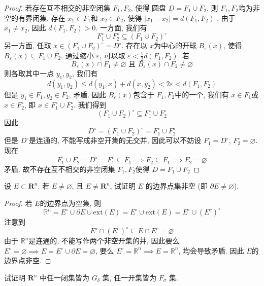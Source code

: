 \documentclass[../main.tex]{subfiles}
\begin{document}
\begin{proof}
    若存在互不相交的非空闭集 \(  F_1, F_2  \), 使得 圆盘 \(  D= F_1\cup F_2  \). 则 \(  F_1,F_2  \)均为非空的有界闭集.   存在 \(  x_1\in F_1  \)和 \(  x_2\in F_2  \), 使得 \(  \left| x_1-x_2 \right|= d\left( F_1,F_2 \right)    \)   . 由于 \(  x_1\neq x_2  \), 因此 \(  d\left( F_1,F_2 \right)> 0   \). 一方面, 我们有 \[
    F_1^{\circ}\cup F_2^{\circ}\subseteq \left( F_1\cup F_2 \right)^{\circ} 
    \]  另一方面, 任取 \(  x\in \left( F_1\cup F_2 \right)^{\circ}= D^{\circ}   \). 存在以  \(  x  \)为中心的开球 \(  B_{ \varepsilon }\left( x \right)   \), 使得 \(  B_{ \varepsilon }\left( x \right)\subseteq F_1\cup F_2   \). 通过缩小 \(   \varepsilon   \), 可以取 \(   \varepsilon < \frac{1 }{2 }d\left( F_1,F_2 \right)    \). 若 \[
    B_{ \varepsilon }\left( x \right)\cap F_1\neq \varnothing\text{ 且 } B_{ \varepsilon }\left( x \right)\cap F_2\neq \varnothing  
    \]  则各取其中一点 \(  y_1,y_2  \), 我们有 \[
    d\left( y_1,y_2 \right)\le d\left( y_1,x \right)+ d\left( x,y_2 \right)< 2 \varepsilon < d\left( F_1,F_2 \right)    
    \] 但是 \(  y_1\in F_1, y_2\in F_2  \), 矛盾. 因此 \(  B_{ \varepsilon }\left( x \right)   \)包含于 \(  F_1,F_2  \)中的一个, 我们有 \(  x \in F_1^{\circ}  \)或 \(  x\in F_2^{\circ}  \), 即 \(  x \in F_1^{\circ}\cup F_2^{\circ}  \).   我们得到 \[
    \left( F_1\cup F_2 \right)^{\circ}\subseteq F_1^{\circ}\cup F_2^{\circ} 
    \]  因此 \[
    D^{\circ}= \left( F_1\cup F_2 \right)^{\circ}= F_1^{\circ}\cup F_2^{\circ} 
    \]但是 \(  D^{\circ}  \)是连通的, 不能写成非空开集的无交并, 因此可以不妨设 \(  F_1^{\circ}= D^{\circ}  \), \(  F_2^{\circ}= \varnothing  \). 现在 \[
    F_1\cup F_2= \overline{D^{\circ}}= \overline{F_1^{\circ}}\subseteq  F_1\implies F_2\subseteq F_1\implies F_2= \varnothing
    \]   矛盾. 故不存在互不相交的非空闭集 \(  F_1,F_2  \)使得 \(  D= F_1\cup F_2  \)  
\end{proof}

\begin{exercise}{}{}
设 $E \subset \mathbf{R}^n$. 若 $E \neq \varnothing$, 且 $E \neq \mathbf{R}^n$, 试证明 $E$ 的边界点集非空 (即 $\partial E \neq \varnothing$).
\end{exercise}
\begin{proof}
    若 \(  E  \)的边界点为空集, 则 \[
    \mathbb{R} ^{n}= E^{\circ}\cup  \partial E\cup  \mathrm{ext}\left( E \right)= E^{\circ}\cup \mathrm{ext}\left( E \right)= E^{\circ}\cup \left( E^{c} \right)^{\circ}   
    \] 注意到\[
    E^{\circ}\cap \left( E^{c} \right)^{\circ}\subseteq E\cap E^{c}= \varnothing 
    \]由于 \(  \mathbb{R} ^{n}  \)是连通的, 不能写作两个非空开集的并, 因此要么 \(  E^{\circ}= \varnothing\implies E= E^{\circ}\cup  \partial E= \varnothing  \), 要么 \(  E^{\circ}= \mathbb{R} ^{n}\implies E= \mathbb{R} ^{n}   \), 均会导致矛盾. 因此 \(  E  \)的边界点非空.    
\end{proof}
\begin{exercise}{}{}
试证明 $\mathbf{R}^n$ 中任一闭集皆为 $G_\delta$ 集, 任一开集皆为 $F_\sigma$ 集.
    \end{exercise}
\end{document}
